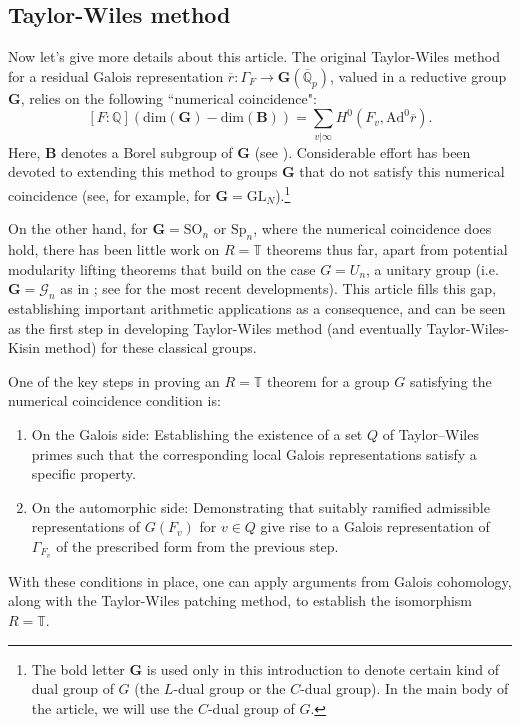 \documentclass[12pt,oneside,reqno]{amsart}
\theoremstyle{plain}
\begin{document}
	\subsection*{Taylor-Wiles method}
	Now let's give more details about this article.
	The original Taylor-Wiles method for a residual Galois representation $\overline{r}\colon\Gamma_{F}\to\mathbf{G}(\overline{\mathbb{Q}}_p)$, valued in a reductive group $\mathbf{G}$, relies on the following ``numerical coincidence":
	\[
	[F\colon\mathbb{Q}](\mathrm{dim}(\mathbf{G})-\mathrm{dim}(\mathbf{B}))
	=
	\sum_{v|\infty}H^0(F_v,\mathrm{Ad}^0\overline{r}).
	\]
	Here, $\mathbf{B}$ denotes a Borel subgroup of $\mathbf{G}$ (see \cite[§1]{ClozelHarrisTaylor2008}). Considerable effort has been devoted to extending this method to groups $\mathbf{G}$ that do not satisfy this numerical coincidence (see, for example, \cite{CalegariGeraghty2018} for $\mathbf{G} = \mathrm{GL}_N$).\footnote{The bold letter $\mathbf{G}$ is used only in this introduction to denote certain kind of dual group of $G$ (the $L$-dual group or the $C$-dual group). In the main body of the article, we will use the $C$-dual group of $G$.}
	
	On the other hand, for $\mathbf{G} = \mathrm{SO}_n$ or $\mathrm{Sp}_n$, where the numerical coincidence does hold, there has been little work on $R = \mathbb{T}$ theorems thus far, apart from potential modularity lifting theorems that build on the case $G = U_n$, a unitary group (i.e. $\mathbf{G} = \mathcal{G}_n$ as in \cite{ClozelHarrisTaylor2008}; see \cite{CalegariEmertonGee2022} for the most recent developments). This article fills this gap, establishing important arithmetic applications as a consequence, and can be seen as the first step in developing Taylor-Wiles method (and eventually Taylor-Wiles-Kisin method) for these classical groups.
	
	
	
	
	
	
	
	
	
	One of the key steps in proving an $R = \mathbb{T}$ theorem for a group $G$ satisfying the numerical coincidence condition is:
	\begin{enumerate}
		\item
		On the Galois side: Establishing the existence of a set $Q$ of Taylor–Wiles primes such that the corresponding local Galois representations satisfy a specific property.
		
		
		\item 
		On the automorphic side: Demonstrating that suitably ramified admissible representations of $G(F_v)$ for $v \in Q$ give rise to a Galois representation of $\Gamma_{F_v}$ of the prescribed form from the previous step.
	\end{enumerate}
	With these conditions in place, one can apply arguments from Galois cohomology, along with the Taylor-Wiles patching method, to establish the isomorphism $R = \mathbb{T}$.
	
\end{document}

